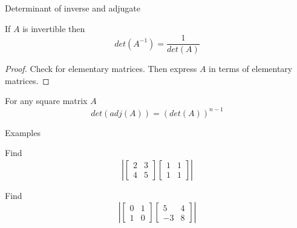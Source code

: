 \documentclass{beamer}
\begin{document}
\begin{frame}{Determinant of inverse and adjugate}
  \begin{theorem}
    If $A$ is invertible then
    \begin{equation*}
      det(A^{-1}) = \frac{1}{det(A)}
    \end{equation*}
    \begin{proof}
      Check for elementary matrices. Then express $A$ in terms of elementary matrices.
    \end{proof}
  \end{theorem}
  \begin{theorem}
    For any square matrix $A$
    \begin{equation*}
      det(adj(A)) = (det(A))^{n-1}
    \end{equation*}
  \end{theorem}
\end{frame}

\begin{frame}{Examples}
  \begin{example}
    Find
    \begin{equation*}
      \left|
        \left[
          \begin{array}{cc}
            2&3\\
            4&5
          \end{array}
        \right]
        \left[
          \begin{array}{cc}
            1&1\\
            1&1
          \end{array}
        \right]
      \right|
    \end{equation*}
  \end{example}
  \begin{example}
    Find
    \begin{equation*}
      \left|
        \left[
          \begin{array}{cc}
            0&1\\
            1&0
          \end{array}
        \right]
        \left[
          \begin{array}{cc}
            5&4\\
            -3&8
          \end{array}
        \right]
      \right|
    \end{equation*}
  \end{example}
\end{frame}
\end{document}
